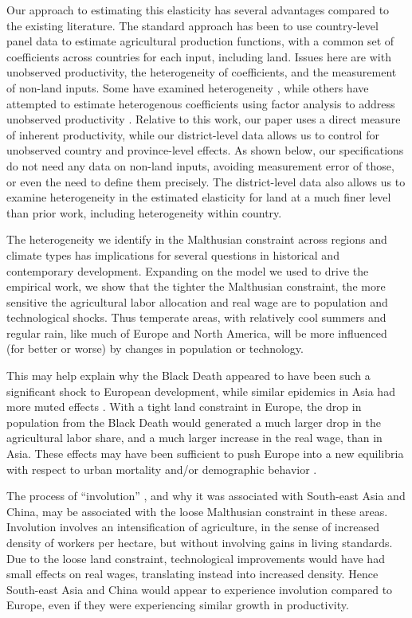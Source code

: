 \documentclass[11pt]{article}
\begin{document}
Our approach to estimating this elasticity has several advantages compared to the existing literature. The standard approach has been to use country-level panel data \citep{Hayami:1970ly,Hayami:1985cr,cpr1997,mm2001,Mundlak:2000dq,mbl2012,et2013mango} to estimate agricultural production functions, with a common set of coefficients across countries for each input, including land. Issues here are with unobserved productivity, the heterogeneity of coefficients, and the measurement of non-land inputs. Some have examined heterogeneity \citep{gg2003,Wiebe2003Resource-Qualit}, while others have attempted to estimate heterogenous coefficients using factor analysis to address unobserved productivity \citep{et2013mango,ev2016clim,ev2016}. Relative to this work, our paper uses a direct measure of inherent productivity, while our district-level data allows us to control for unobserved country and province-level effects. As shown below, our specifications do not need any data on non-land inputs, avoiding measurement error of those, or even the need to define them precisely. The district-level data also allows us to examine heterogeneity in the estimated elasticity for land at a much finer level than prior work, including heterogeneity within country. 

The heterogeneity we identify in the Malthusian constraint across regions and climate types has implications for several questions in historical and contemporary development. Expanding on the model we used to drive the empirical work, we show that the tighter the Malthusian constraint, the more sensitive the agricultural labor allocation and real wage are to population and technological shocks. Thus temperate areas, with relatively cool summers and regular rain, like much of Europe and North America, will be more influenced (for better or worse) by changes in population or technology.

This may help explain why the Black Death appeared to have been such a significant shock to European development, while similar epidemics in Asia had more muted effects \citep{McNeill1976}. With a tight land constraint in Europe, the drop in population from the Black Death would generated a much larger drop in the agricultural labor share, and a much larger increase in the real wage, than in Asia. These effects may have been sufficient to push Europe into a new equilibria with respect to urban mortality and/or demographic behavior \citep{vv13,vv08}. 

The process of ``involution'' \citep{Geertz1963,Huang1990}, and why it was associated with South-east Asia and China, may be associated with the loose Malthusian constraint in these areas. Involution involves an intensification of agriculture, in the sense of increased density of workers per hectare, but without involving gains in living standards. Due to the loose land constraint, technological improvements would have had small effects on real wages, translating instead into increased density. Hence South-east Asia and China would appear to experience involution compared to Europe, even if they were experiencing similar growth in productivity.
\end{document}
